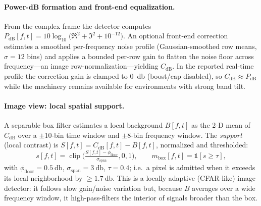 \paragraph{Power-dB formation and front-end equalization.}
From the complex frame the detector computes
$P_{\text{dB}}[f,t]=10\log_{10}\!\big(\Re^2+\Im^2+10^{-12}\big)$. An optional
front-end correction estimates a smoothed per-frequency noise profile
(Gaussian-smoothed row means, $\sigma\!=\!12$ bins) and applies a bounded
per-row gain to flatten the noise floor across frequency---an image
row-normalization---yielding $C_{\text{dB}}$. In the reported real-time profile
the correction gain is clamped to \SI{0}{\decibel} (boost/cap disabled), so
$C_{\text{dB}}\!\approx\!P_{\text{dB}}$ while the machinery remains available for
environments with strong band tilt.

\paragraph{Image view: local spatial support.}
A separable box filter estimates a local background
$B[f,t]$ as the 2-D mean of $C_{\text{dB}}$ over a $\pm$\num{10}-bin time window
and $\pm$\num{8}-bin frequency window. The \emph{support} (local contrast) is
$S[f,t]=C_{\text{dB}}[f,t]-B[f,t]$, normalized and thresholded:
%
\begin{equation}
s[f,t]=\operatorname{clip}\!\Big(\tfrac{S[f,t]-\phi_{\text{floor}}}{\sigma_{\text{span}}},0,1\Big),\qquad
m_{\text{box}}[f,t]=\mathbb{1}\!\left[s\ge\tau\right],
\label{eq:support}
\end{equation}
%
with $\phi_{\text{floor}}=\SI{0.5}{\decibel}$, $\sigma_{\text{span}}=\SI{3}{\decibel}$,
$\tau=0.4$; i.e.\ a pixel is admitted when it exceeds its local neighborhood by
$\ge\SI{1.7}{\decibel}$. This is a locally adaptive (CFAR-like) image detector: it
follows slow gain/noise variation but, because $B$ averages over a wide frequency
window, it high-pass-filters the interior of signals broader than the box.

